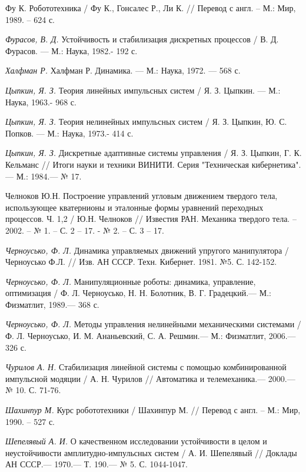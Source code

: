 \begin{thebibliography}{10}
	Фу К. Робототехника / Фу К., Гонсалес Р., Ли К. // Перевод с англ. – М.: Мир, 1989. – 624 с.
	
	{\it Фурасов, В. Д.} Устойчивость и стабилизация дискретных процессов /
	В. Д. Фурасов. — М.: Наука, 1982.- 192 с.
	
	{\it Халфман Р.} Халфман Р. Динамика. — М.: Наука, 1972. — 568 с.
	
	{\it Цыпкин, Я. З.} Теория линейных импульсных систем /
	Я. З. Цыпкин. — М.: Наука, 1963.- 968 с.
	
	{\it Цыпкин, Я. З.} Теория нелинейных импульсных систем /
	Я. З. Цыпкин, Ю. С. Попков. — М.: Наука, 1973.- 414 с.
	
	{\it Цыпкин, Я. З.} Дискретные адаптивные системы управления /
	Я. З. Цыпкин, Г. К. Кельманс // Итоги науки и техники ВИНИТИ. Серия "Техническая кибернетика". — М.: 1984.— № 17.
	
	Челноков Ю.Н. Построение управлений угловым движением твердого тела, использующее кватернионы и эталонные формы уравнений переходных процессов. Ч. 1,2 / Ю.Н. Челноков // Известия РАН. Механика твердого тела. – 2002. – № 1. – С. 2 – 17. - № 2. – С. 3 – 17.
	
	{\it Черноусько, Ф. Л.} Динамика управляемых движений упругого манипулятора / Черноусько Ф.Л. // Изв. АН СССР. Техн. Кибернет. 1981. №5. С. 142-152.
	
	{\it Черноусько, Ф. Л.} Манипуляционные роботы: динамика, управление, оптимизация /
	Ф. Л. Черноусько, Н. Н. Болотник, В. Г. Градецкий.— М.: Физматлит, 1989.— 368 с.
	
	{\it Черноусько, Ф. Л.} Методы управления нелинейными механическими системами /
	Ф. Л. Черноусько, И. М. Ананьевский, С. А. Решмин.— М.: Физматлит, 2006.— 326 с.
	
	{\it Чурилов А. Н.} Стабилизация линейной системы с помощью комбинированной импульсной модяции /
	А. Н. Чурилов // Автоматика и телемеханика.— 2000.— № 10. С. 71-76.
	
	{\it Шахинпур М.} Курс робототехники / Шахинпур М. // Перевод с англ. – М.: Мир, 1990. – 527 с. 
	
	{\it Шепелявый А. И.} О качественном исследовании устойчивости в целом и неустойчивости амплитудно-импульсных систем /
	А. И. Шепелявый // Доклады АН СССР.— 1970.— Т. 190.— № 5. С. 1044-1047.
	

\end{thebibliography}
